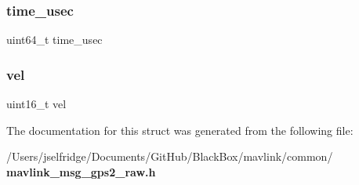 \mbox{\label{struct____mavlink__gps2__raw__t_a2db60704c293664dcb6159b55c98c2f2}} 
\subsubsection{time\+\_\+usec}
{\footnotesize\ttfamily uint64\+\_\+t time\+\_\+usec}

\mbox{\label{struct____mavlink__gps2__raw__t_ab6d53e7a88e63467ea349ec7d5423324}} 
\subsubsection{vel}
{\footnotesize\ttfamily uint16\+\_\+t vel}



The documentation for this struct was generated from the following file\+:\begin{DoxyCompactItemize}
\item 
/\+Users/jselfridge/\+Documents/\+Git\+Hub/\+Black\+Box/mavlink/common/\textbf{ mavlink\+\_\+msg\+\_\+gps2\+\_\+raw.\+h}\end{DoxyCompactItemize}
